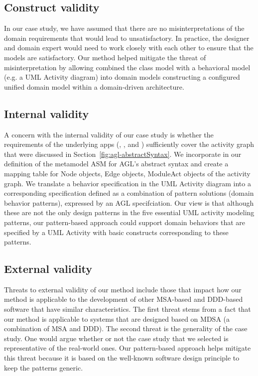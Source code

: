 \subsection{Construct validity}
In our case study, we have assumed that there are no misinterpretations of the domain requirements that would lead to unsatisfactory. In practice, the designer and domain expert would need to work closely with each other to ensure that the models are satisfactory.
Our method helped mitigate the threat of misinterpretation by allowing combined the class model with a behavioral model (e.g. a UML Activity
diagram) into domain models constructing a configured unified domain model within a domain-driven architecture.
%
\subsection{Internal validity}
A concern with the internal validity of our case study is whether the requirements of the underlying apps (\courseman, \processman, and \orderman) sufficiently cover the activity graph that were discussed in Section~\ref{fig:agl-abstractSyntax}. We incorporate in our definition of the metamodel ASM for AGL's abstract syntax and create a mapping table for Node objects, Edge objects, ModuleAct objects of the activity graph. We translate a behavior specification in the UML Activity diagram into a corresponding specification defined as a combination of pattern solutions (domain behavior patterns), expressed by an AGL specifciation. Our view is that although these are not the only design patterns in the five essential UML activity modeling patterns, our pattern-based approach could support domain behaviors that are specified by a UML Activity with basic constructs corresponding to these patterns.
%
\subsection{External validity}
Threats to external validity of our method include those that impact how our method is applicable to the development of other MSA-based and DDD-based software that have similar characteristics. The first threat stems from a fact that our method is applicable to systems that are designed based on MDSA (a combination of MSA and DDD). The second threat is the generality of the case study. One would argue whether or not the case study that we selected is representative of the real-world ones. Our pattern-based approach helps mitigate this threat because it is based on the well-known software design principle to keep the patterns generic.